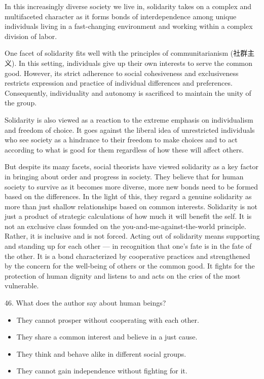 \documentclass[UTF8,11pt]{ctexart}
\begin{document}
In this increasingly diverse society we live in, solidarity takes on a complex and multifaceted character as it forms bonds of interdependence among unique individuals living in a fast-changing environment and working within a complex division of labor.


One facet of solidarity fits well with the principles of communitarianism (社群主义). In this setting, individuals give up their own interests to serve the common good. However, its strict adherence to social cohesiveness and exclusiveness restricts expression and practice of individual differences and preferences. Consequently, individuality and autonomy is sacrificed to maintain the unity of the group.


Solidarity is also viewed as a reaction to the extreme emphasis on individualism and freedom of choice. It goes against the liberal idea of unrestricted individuals who see society as a hindrance to their freedom to make choices and to act according to what is good for them regardless of how these will affect others.


But despite its many facets, social theorists have viewed solidarity as a key factor in bringing about order and progress in society. They believe that for human society to survive as it becomes more diverse, more new bonds need to be formed based on the differences. In the light of this, they regard a genuine solidarity as more than just shallow relationships based on common interests. Solidarity is not just a product of strategic calculations of how much it will benefit the self. It is not an exclusive class founded on the you-and-me-against-the-world principle. Rather, it is inclusive and is not forced. Acting out of solidarity means supporting and standing up for each other — in recognition that one’s fate is in the fate of the other. It is a bond characterized by cooperative practices and strengthened by the concern for the well-being of others or the common good. It fights for the protection of human dignity and listens to and acts on the cries of the most vulnerable.


46. What does the author say about human beings?


\begin{itemize}[leftmargin=2em,itemsep=.2em,topsep=.4em]\item[A.] They cannot prosper without cooperating with each other.
\item[B.] They share a common interest and believe in a just cause.
\item[C.] They think and behave alike in different social groups.
\item[D.] They cannot gain independence without fighting for it.
\end{itemize}
\end{document}
